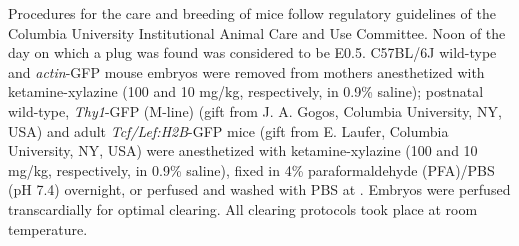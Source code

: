 Procedures for the care and breeding of mice follow regulatory guidelines of the Columbia University Institutional Animal Care and Use Committee.
Noon of the day on which a plug was found was considered to be E0.5.
C57BL/6J wild-type and \emph{actin}-GFP mouse embryos were removed from mothers anesthetized with ketamine-xylazine (100 and 10 mg/kg, respectively, in 0.9\% saline); postnatal wild-type, \emph{Thy1}-GFP (M-line) (gift from J. A. Gogos, Columbia University, NY, USA) and adult \emph{Tcf/Lef:H2B}-GFP mice (gift from E. Laufer, Columbia University, NY, USA) were anesthetized with ketamine-xylazine (100 and 10 mg/kg, respectively, in 0.9\% saline), fixed in 4\% paraformaldehyde (PFA)/PBS (pH 7.4) overnight, or perfused and washed with PBS at .
Embryos were perfused transcardially for optimal clearing.
All clearing protocols took place at room temperature.